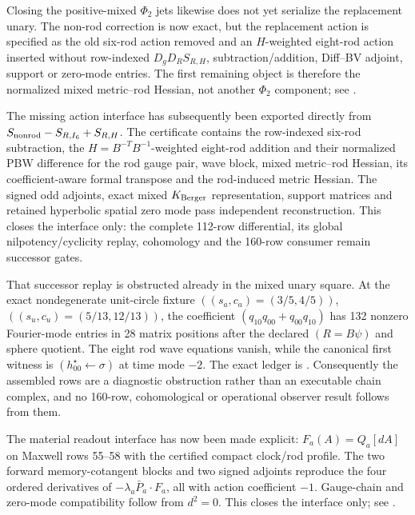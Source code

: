 \documentclass[11pt]{article}
\theoremstyle{definition}
\theoremstyle{remark}
\begin{document}
Closing the positive-mixed \(\Phi_2\) jets likewise does not yet serialize
the replacement unary.  The non-rod correction is now exact, but the
replacement action is specified as the old six-rod action removed and an
\(H\)-weighted eight-rod action inserted without row-indexed
\(D_gD_RS_{R,H}\), subtraction/addition, Diff--BV adjoint, support or
zero-mode entries.  The first remaining object is therefore the normalized
mixed metric--rod Hessian, not another \(\Phi_2\) component; see
.

The missing action interface has subsequently been exported directly from
\(S_{\rm nonrod}-S_{R,I_6}+S_{R,H}\).  The certificate
contains the row-indexed six-rod subtraction, the
\(H=B^{-T}B^{-1}\)-weighted eight-rod addition and their normalized PBW
difference for the rod gauge pair, wave block, mixed metric--rod Hessian,
its coefficient-aware formal transpose and the rod-induced metric Hessian.
The signed odd adjoints, exact mixed \(K_{\rm Berger}\) representation,
support matrices and retained hyperbolic spatial zero mode pass independent
reconstruction.  This closes the interface only: the complete 112-row
differential, its global nilpotency/cyclicity replay, cohomology and the
160-row consumer remain successor gates.

That successor replay is obstructed already in the mixed unary square.  At
the exact nondegenerate unit-circle fixture
$((s_a,c_a)=(3/5,4/5))$, $((s_u,c_u)=(5/13,12/13))$, the coefficient
$(q_{10}q_{00}+q_{00}q_{10})$ has 132 nonzero Fourier-mode entries in 28
matrix positions after the declared $(R=B\psi)$ and sphere quotient.  The
eight rod wave equations vanish, while the canonical first witness is
$(h^{\star}_{00}\leftarrow\sigma)$ at time mode $-2$.  The exact ledger is
.
Consequently the assembled rows are a diagnostic obstruction rather than an
executable chain complex, and no 160-row, cohomological or operational
observer result follows from them.

The material readout interface has now been made explicit:
\(F_a(A)=Q_a[dA]\) on Maxwell rows 55--58 with the certified compact
clock/rod profile.  The two forward memory-cotangent blocks and two signed
adjoints reproduce the four ordered derivatives of
\(-\lambda_a\bar P_a\cdot F_a\), all with action coefficient \(-1\).
Gauge-chain and zero-mode compatibility follow from \(d^2=0\).  This closes
the interface only; see
.
\end{document}
